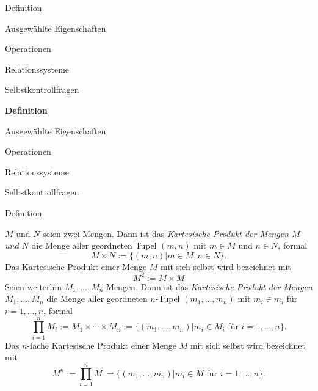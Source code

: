 \documentclass[
  8pt,
  ignorenonframetext,
]{beamer}
\begin{document}
\begin{frame}{}
\protect\hypertarget{section-2}{}
\vfill
\Large

Definition

Ausgewählte Eigenschaften

Operationen

Relationssysteme

Selbstkontrollfragen \vfill
\end{frame}

\begin{frame}{}
\protect\hypertarget{section-3}{}
\vfill
\Large

\textbf{Definition}

Ausgewählte Eigenschaften

Operationen

Relationssysteme

Selbstkontrollfragen \vfill
\end{frame}

\begin{frame}{Definition}
\protect\hypertarget{definition}{}
\footnotesize
\begin{definition}
\justifying
$M$ und $N$ seien zwei Mengen. Dann ist das \textit{Kartesische Produkt der Mengen
$M$ und $N$} die Menge aller geordneten Tupel $(m,n)$ mit $m \in M$ und $n \in N$,
formal
\begin{equation}
M \times N := \{(m,n)|m\in M, n\in N\}.
\end{equation}
Das Kartesische Produkt einer Menge $M$ mit sich selbst wird bezeichnet mit
\begin{equation}
M^2 := M \times M
\end{equation}
Seien weiterhin $M_1,...,M_n$ Mengen. Dann ist das \textit{Kartesische Produkt
der Mengen $M_1,...,M_n$} die Menge aller geordneten $n$-Tupel $(m_1,...,m_n)$
mit $m_i \in m_i$ für $i = 1,...,n$, formal
\begin{equation}
\prod_{i=1}^n M_i := M_1 \times \cdots \times M_n := \{(m_1,...,m_n)|m_i \in M_i \mbox{ für } i = 1,...,n\}.
\end{equation}
Das $n$-fache Kartesische Produkt einer Menge $M$ mit sich selbst wird bezeichnet mit
\begin{equation}
M^n := \prod_{i=1}^n M := \{(m_1,...,m_n)|m_i \in M \mbox{ für } i = 1,...,n\}.
\end{equation}
\end{definition}
\end{frame}
\end{document}
